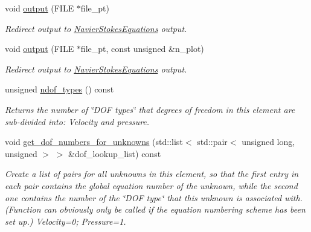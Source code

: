 \begin{DoxyCompactItemize}
void \hyperlink{classoomph_1_1GeneralisedNewtonianAxisymmetricQTaylorHoodElement_aa1cdcb0e344c3f3745e9fb9ad0fe3e33}{output} (F\+I\+LE $\ast$file\+\_\+pt)
\begin{DoxyCompactList}\small\item\em Redirect output to \hyperlink{classoomph_1_1NavierStokesEquations}{Navier\+Stokes\+Equations} output. \end{DoxyCompactList}\item 
void \hyperlink{classoomph_1_1GeneralisedNewtonianAxisymmetricQTaylorHoodElement_a20ac0d0543f6f277139e526022edd5fd}{output} (F\+I\+LE $\ast$file\+\_\+pt, const unsigned \&n\+\_\+plot)
\begin{DoxyCompactList}\small\item\em Redirect output to \hyperlink{classoomph_1_1NavierStokesEquations}{Navier\+Stokes\+Equations} output. \end{DoxyCompactList}\item 
unsigned \hyperlink{classoomph_1_1GeneralisedNewtonianAxisymmetricQTaylorHoodElement_a4327576642aa78c8aadc175f44c85c17}{ndof\+\_\+types} () const
\begin{DoxyCompactList}\small\item\em Returns the number of \char`\"{}\+D\+O\+F types\char`\"{} that degrees of freedom in this element are sub-\/divided into\+: Velocity and pressure. \end{DoxyCompactList}\item 
void \hyperlink{classoomph_1_1GeneralisedNewtonianAxisymmetricQTaylorHoodElement_a88d4fad547ca6ad754563bc7f1ecf34f}{get\+\_\+dof\+\_\+numbers\+\_\+for\+\_\+unknowns} (std\+::list$<$ std\+::pair$<$ unsigned long, unsigned $>$ $>$ \&dof\+\_\+lookup\+\_\+list) const
\begin{DoxyCompactList}\small\item\em Create a list of pairs for all unknowns in this element, so that the first entry in each pair contains the global equation number of the unknown, while the second one contains the number of the \char`\"{}\+D\+O\+F type\char`\"{} that this unknown is associated with. (Function can obviously only be called if the equation numbering scheme has been set up.) Velocity=0; Pressure=1. \end{DoxyCompactList}\end{DoxyCompactItemize}
